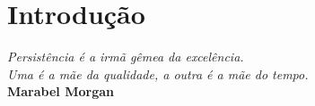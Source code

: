 \chapter{Introdução}\label{cap:cap_01}

\begin{flushright}
	\textit{
		Persistência é a irmã gêmea da excelência. \\
		Uma é a mãe da qualidade, a outra é a mãe do tempo.
	} \\
	
	\textbf{Marabel Morgan}
\end{flushright}